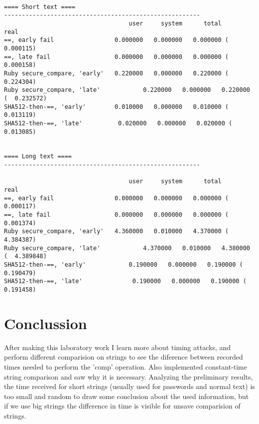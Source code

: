 \documentclass{article}
\begin{document}
    \begin{lstlisting}

==== Short text ====
------------------------------------------------------- 
                                   user     system      total        real
==, early fail                 0.000000   0.000000   0.000000 (  0.000115)
==, late fail                  0.000000   0.000000   0.000000 (  0.000158)
Ruby secure_compare, 'early'   0.220000   0.000000   0.220000 (  0.224304)
Ruby secure_compare, 'late'            0.220000   0.000000   0.220000 (  0.232572)
SHA512-then-==, 'early'        0.010000   0.000000   0.010000 (  0.013119)
SHA512-then-==, 'late'          0.020000   0.000000   0.020000 (  0.013085)


==== Long text ====
------------------------------------------------------- 

                                   user     system      total        real
==, early fail                 0.000000   0.000000   0.000000 (  0.000117)
==, late fail                  0.000000   0.000000   0.000000 (  0.001374)
Ruby secure_compare, 'early'   4.360000   0.010000   4.370000 (  4.384387)
Ruby secure_compare, 'late'            4.370000   0.010000   4.380000 (  4.389848)
SHA512-then-==, 'early'            0.190000   0.000000   0.190000 (  0.190479)
SHA512-then-==, 'late'              0.190000   0.000000   0.190000 (  0.191458)

    \end{lstlisting}


 \section{Conclussion}

    After making this laboratory work I learn more about timing attacks, and perform
    different comparision on strings to see the diference between recorded times needed
    to perform the 'comp' operation. Also implemented constant-time string comparison and saw why it is necessary.
    Analyzing the preliminary results, the time received for short strings (usually used for passwords and normal text) is too small and random to draw some conclusion about the 
    used information, but if we use big strings the difference in time is visible for unsave comparision of strings.
\end{document}
